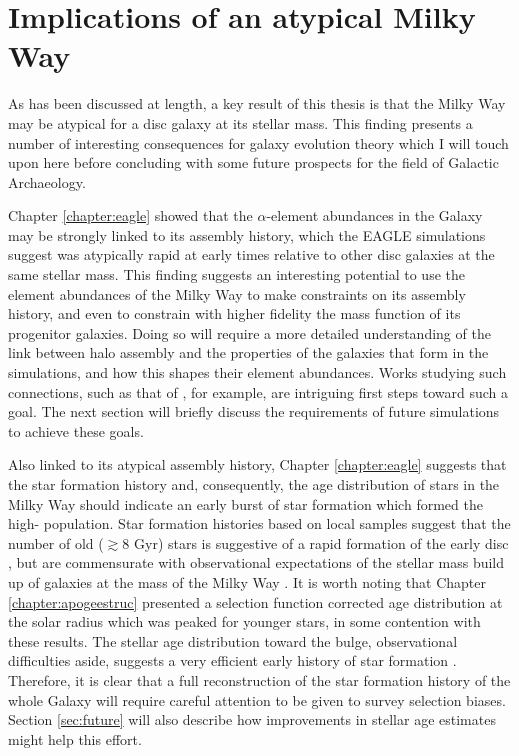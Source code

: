 \section{Implications of an atypical Milky Way}

As has been discussed at length, a key result of this thesis is that the Milky Way may be atypical for a disc galaxy at its stellar mass. This finding presents a number of interesting consequences for galaxy evolution theory which I will touch upon here before concluding with some future prospects for the field of Galactic Archaeology. 

Chapter \ref{chapter:eagle} showed that the $\alpha$-element abundances in the Galaxy may be strongly linked to its assembly history, which the EAGLE simulations suggest was atypically rapid at early times relative to other disc galaxies at the same stellar mass. This finding suggests an interesting potential to use the element abundances of the Milky Way to make constraints on its assembly history, and even to constrain with higher fidelity the mass function of its progenitor galaxies. Doing so will require a more detailed understanding of the link between halo assembly and the properties of the galaxies that form in the simulations, and how this shapes their element abundances. Works studying such connections, such as that of \citet{2018arXiv180505956M}, for example, are intriguing first steps toward such a goal. The next section will briefly discuss the requirements of future simulations to achieve these goals.

Also linked to its atypical assembly history, Chapter \ref{chapter:eagle} suggests that the star formation history and, consequently, the age distribution of stars in the Milky Way should indicate an early burst of star formation which formed the high-\afe{} population. Star formation histories based on local samples suggest that the number of old ($\gtrsim 8$ Gyr) stars is suggestive of a rapid formation of the early disc \citep{2015A&A...578A..87S}, but are commensurate with observational expectations of the stellar mass build up of galaxies at the mass of the Milky Way \citep{2014ApJ...781L..31S}. It is worth noting that Chapter \ref{chapter:apogeestruc} presented a selection function corrected age distribution at the solar radius which was peaked for younger stars, in some contention with these results. The stellar age distribution toward the bulge, observational difficulties aside, suggests a very efficient early history of star formation \citep[e.g.][]{2018MNRAS.477.3507B}. Therefore, it is clear that a full reconstruction of the star formation history of the whole Galaxy will require careful attention to be given to survey selection biases. Section \ref{sec:future} will also describe how improvements in stellar age estimates might help this effort.

